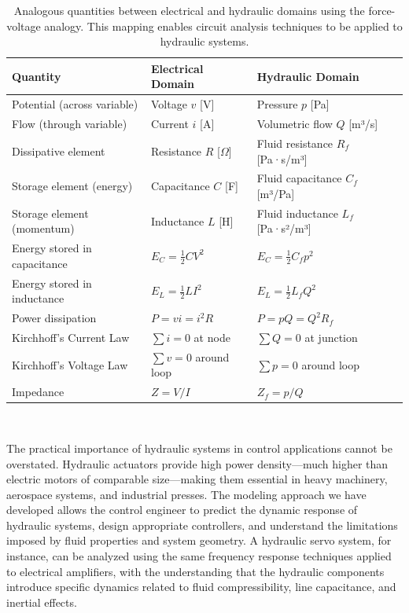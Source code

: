 \begin{table}[h]
\centering
\bgroup
\def\arraystretch{1.2}
\begin{tabular}{|l|l|l|}
\hline
\textbf{Quantity} & \textbf{Electrical Domain} & \textbf{Hydraulic Domain} \\ \hline
Potential (across variable) & Voltage $v$ [V] & Pressure $p$ [Pa] \\ \hline
Flow (through variable) & Current $i$ [A] & Volumetric flow $Q$ [m³/s] \\ \hline
Dissipative element & Resistance $R$ [$\Omega$] & Fluid resistance $R_f$ [Pa·s/m³] \\ \hline
Storage element (energy) & Capacitance $C$ [F] & Fluid capacitance $C_f$ [m³/Pa] \\ \hline
Storage element (momentum) & Inductance $L$ [H] & Fluid inductance $L_f$ [Pa·s²/m³] \\ \hline
Energy stored in capacitance & $E_C = \frac{1}{2}CV^2$ & $E_C = \frac{1}{2}C_f p^2$ \\ \hline
Energy stored in inductance & $E_L = \frac{1}{2}LI^2$ & $E_L = \frac{1}{2}L_f Q^2$ \\ \hline
Power dissipation & $P = vi = i^2R$ & $P = pQ = Q^2 R_f$ \\ \hline
Kirchhoff's Current Law & $\sum i = 0$ at node & $\sum Q = 0$ at junction \\ \hline
Kirchhoff's Voltage Law & $\sum v = 0$ around loop & $\sum p = 0$ around loop \\ \hline
Impedance & $Z = V/I$ & $Z_f = p/Q$ \\ \hline
\end{tabular}
\egroup
\\[0.5em]
\caption{Analogous quantities between electrical and hydraulic domains using the force-voltage analogy. This mapping enables circuit analysis techniques to be applied to hydraulic systems.\label{tab:domain_analogy}}
\end{table}

The practical importance of hydraulic systems in control applications cannot be overstated. Hydraulic actuators provide high power density—much higher than electric motors of comparable size—making them essential in heavy machinery, aerospace systems, and industrial presses. The modeling approach we have developed allows the control engineer to predict the dynamic response of hydraulic systems, design appropriate controllers, and understand the limitations imposed by fluid properties and system geometry. A hydraulic servo system, for instance, can be analyzed using the same frequency response techniques applied to electrical amplifiers, with the understanding that the hydraulic components introduce specific dynamics related to fluid compressibility, line capacitance, and inertial effects.

